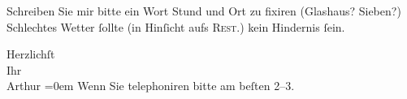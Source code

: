 \pstart
           Schreiben Sie mir bitte ein Wort {\pb}Stund und Ort zu
               fixiren (Glashaus? Sieben?)
               Schlechtes Wetter{ }ſollte (in Hinſicht aufs \textsc{Rest.}) kein
               Hindernis{ }ſein.\pend
           
\pstart
           Herzlichſt{\\[\baselineskip]}Ihr{\\[\baselineskip]}\spacefill\mbox{Arthur}\pend
           \leftskip=0em{}
\pstart
           \noindent{}{\pb}Wenn Sie telephoniren bitte am beſten 2–3.\pend
           \endnumbering{}  \newcommand{\dateiname}{L01306}\newcommand{\titel}{Arthur Schnitzler an Richard Beer-Hofmann, 6. 8. 1903}\newcommand{\editorInnen}{Martin Anton Müller und Gerd-Hermann Susen}

